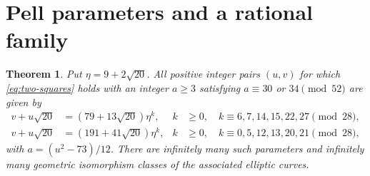 \documentclass[draft]{publmathdeb}
\newtheorem{theorem}{Theorem}[section]
\theoremstyle{remark}
\numberwithin{equation}{section}
\begin{document}
\section{Pell parameters and a rational family}

\begin{samepage}
  \begin{theorem}\label{thm:pell}
    Put $\eta=9+2\sqrt{20}$. All positive integer pairs $(u,v)$ for which \eqref{eq:two-squares} holds with an integer $a\geq3$ satisfying $a\equiv30$ or $34\pmod{52}$ are given by
    \begin{align*}
      v+u\sqrt{20} & =(79+13\sqrt{20})\eta^k,
                   & k                         & \geq0,\quad k\equiv6,7,14,15,22,27\pmod{28}, \\
      v+u\sqrt{20} & =(191+41\sqrt{20})\eta^k,
                   & k                         & \geq0,\quad k\equiv0,5,12,13,20,21\pmod{28},
    \end{align*}
    with $a=(u^2-73)/12$. There are infinitely many such parameters and infinitely many geometric isomorphism classes of the associated elliptic curves.
  \end{theorem}
\end{samepage}
\end{document}
